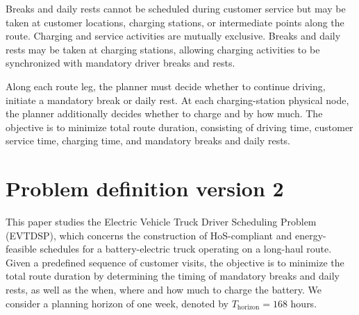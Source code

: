 \documentclass[3p,11pt,authoryear]{elsarticle}  %
\begin{document}
Breaks and daily rests cannot be scheduled during customer service but may be taken at customer locations, charging stations, or intermediate points along the route. Charging and service activities are mutually exclusive. Breaks and daily rests may be taken at charging stations, allowing charging activities to be synchronized with mandatory driver breaks and rests. 

Along each route leg, the planner must decide whether to continue driving, initiate a mandatory break or daily rest. At each charging-station physical node, the planner additionally decides whether to charge and by how much. The objective is to minimize total route duration, consisting of driving time, customer service time, charging time, and mandatory breaks and daily rests.
%

   \section{Problem definition version 2}
    
    
    
This paper studies the Electric Vehicle Truck Driver Scheduling Problem (EVTDSP), which concerns the construction of HoS-compliant and energy-feasible schedules for a battery-electric truck operating on a long-haul route. Given a predefined sequence of customer visits, the objective is to minimize the total route duration by determining the timing of mandatory breaks and daily rests, as well as the when, where and how much to  charge the battery. We consider a planning horizon of one week, denoted by \(T_{\text{horizon}}=168\) hours.
\end{document}
